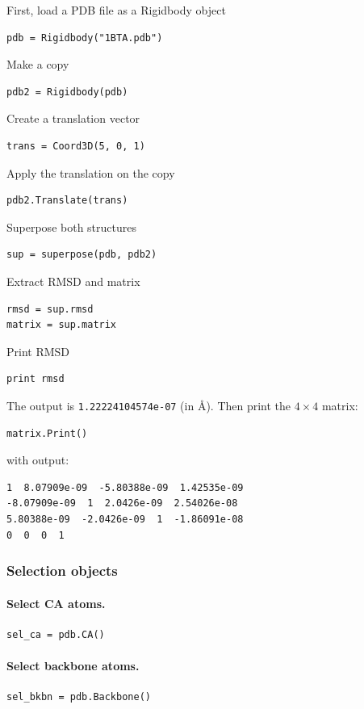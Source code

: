 \documentclass[12pt,a4paper]{article}
\begin{document}
\noindent
First, load a PDB file as a Rigidbody object
\begin{verbatim}
pdb = Rigidbody("1BTA.pdb")
\end{verbatim}
Make a copy
\begin{verbatim}
pdb2 = Rigidbody(pdb)
\end{verbatim}
Create a translation vector
\begin{verbatim}
trans = Coord3D(5, 0, 1)
\end{verbatim}
Apply the translation on the copy
\begin{verbatim}
pdb2.Translate(trans)
\end{verbatim}
Superpose both structures
\begin{verbatim}
sup = superpose(pdb, pdb2)
\end{verbatim}
Extract RMSD and matrix
\begin{verbatim}
rmsd = sup.rmsd
matrix = sup.matrix
\end{verbatim}
Print RMSD
\begin{verbatim}
print rmsd
\end{verbatim}
The output is {\tt 1.22224104574e-07} (in \AA). Then print the $4 \times 4$ matrix:
\begin{verbatim}
matrix.Print()
\end{verbatim}
with output:
\begin{verbatim}
1  8.07909e-09  -5.80388e-09  1.42535e-09  
-8.07909e-09  1  2.0426e-09  2.54026e-08  
5.80388e-09  -2.0426e-09  1  -1.86091e-08  
0  0  0  1  
\end{verbatim}


\subsubsection{Selection objects}

\paragraph{Select CA atoms.}
\begin{verbatim}
sel_ca = pdb.CA()
\end{verbatim}


\paragraph{Select backbone atoms.}
\begin{verbatim}
sel_bkbn = pdb.Backbone()
\end{verbatim}
\end{document}
